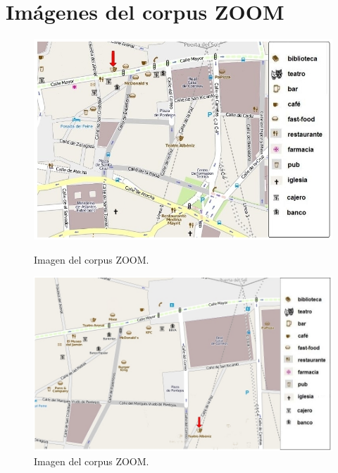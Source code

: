 \chapter{Im\'agenes del corpus ZOOM}
\label{imagenes-zoom}


\begin{figure}
\begin{minipage}[ht]{0.5\linewidth}
\centering
\includegraphics[width=\textwidth]{images/corpus/mapa1.png}
\caption{Imagen del corpus ZOOM.}
\label{mapa1}
\end{minipage}
\hspace*{0cm}
\begin{minipage}[ht]{0.5\linewidth}
\centering
\includegraphics[width=\textwidth]{images/corpus/mapa2.png}
\caption{Imagen del corpus ZOOM.}
\label{mapa2}
\end{minipage}
\end{figure}


